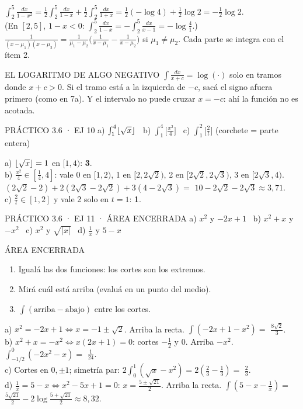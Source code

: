 $\int_2^5\frac{dx}{1-x^2}=\frac12\int_2^5\frac{dx}{1-x}+\frac12\int_2^5\frac{dx}{1+x}=\frac12(-\log4)+\frac12\log2=-\frac12\log2$.\\
(En $[2,5]$, $1-x<0$: $\int_2^5\frac{dx}{1-x}=-\int_2^5\frac{dx}{x-1}=-\log\frac41$.)
$\frac1{(x-\mu_1)(x-\mu_2)}=\frac1{\mu_1-\mu_2}\Big(\frac1{x-\mu_1}-\frac1{x-\mu_2}\Big)$ si $\mu_1\neq\mu_2$. Cada parte se integra con el ítem 2.
\begin{trampa}{EL LOGARITMO DE ALGO NEGATIVO}
$\int\frac{dx}{x+c}=\log(\cdot)$ solo en tramos donde $x+c>0$. Si el tramo está a la izquierda de $-c$, sacá el signo afuera primero (como en 7a). Y el intervalo no puede cruzar $x=-c$: ahí la función no es acotada.
\end{trampa}

\begin{enunciado}{PRÁCTICO 3.6 · EJ 10}
a) $\int_1^4\lfloor \sqrt x\rfloor$ \ b) $\int_1^4\big[\frac{x^2}4\big]$ \ c) $\int_1^2\big[\frac2t\big]$ (corchete = parte entera)
\end{enunciado}
a) $\lfloor \sqrt x\rfloor=1$ en $[1,4)$: \textbf{3}.\\
b) $\frac{x^2}4\in[\frac14,4]$: vale 0 en $[1,2)$, 1 en $[2,2\sqrt2)$, 2 en $[2\sqrt2,2\sqrt3)$, 3 en $[2\sqrt3,4)$. $(2\sqrt2-2)+2(2\sqrt3-2\sqrt2)+3(4-2\sqrt3)=$ \textbf{$10-2\sqrt2-2\sqrt3\approx3{,}71$}.\\
c) $\frac2t\in[1,2]$ y vale 2 solo en $t=1$: \textbf{1}.

\begin{enunciado}{PRÁCTICO 3.6 · EJ 11 · ÁREA ENCERRADA}
a) $x^2$ y $-2x+1$ \ b) $x^2+x$ y $-x^2$ \ c) $x^2$ y $\sqrt{|x|}$ \ d) $\frac1x$ y $5-x$
\end{enunciado}
\begin{metodo}{ÁREA ENCERRADA}
\begin{enumerate}
\item Igualá las dos funciones: los cortes son los extremos.
\item Mirá cuál está arriba (evaluá en un punto del medio).
\item $\int(\text{arriba}-\text{abajo})$ entre los cortes.
\end{enumerate}
\end{metodo}
a) $x^2=-2x+1\iff x=-1\pm\sqrt2$. Arriba la recta. $\int(-2x+1-x^2)=$ \textbf{$\frac{8\sqrt2}3$}.\\
b) $x^2+x=-x^2\iff x(2x+1)=0$: cortes $-\frac12$ y 0. Arriba $-x^2$. $\int_{-1/2}^0(-2x^2-x)=$ \textbf{$\frac1{24}$}.\\
c) Cortes en $0,\pm1$; simetría par: $2\int_0^1(\sqrt x-x^2)=2(\frac23-\frac13)=$ \textbf{$\frac23$}.\\
d) $\frac1x=5-x\iff x^2-5x+1=0$: $x=\frac{5\pm\sqrt{21}}2$. Arriba la recta. $\int(5-x-\frac1x)=$ \textbf{$\frac{5\sqrt{21}}2-2\log\frac{5+\sqrt{21}}2\approx8{,}32$}.

